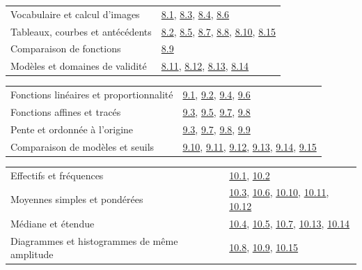 \begin{tabularx}{\linewidth}{@{}Yl@{}}\toprule
Vocabulaire et calcul d’images & \hyperref[exo-8-1]{8.1}, \hyperref[exo-8-3]{8.3}, \hyperref[exo-8-4]{8.4}, \hyperref[exo-8-6]{8.6}\\[2mm]
Tableaux, courbes et antécédents & \hyperref[exo-8-2]{8.2}, \hyperref[exo-8-5]{8.5}, \hyperref[exo-8-7]{8.7}, \hyperref[exo-8-8]{8.8}, \hyperref[exo-8-10]{8.10}, \hyperref[exo-8-15]{8.15}\\[2mm]
Comparaison de fonctions & \hyperref[exo-8-9]{8.9}\\[2mm]
Modèles et domaines de validité & \hyperref[exo-8-11]{8.11}, \hyperref[exo-8-12]{8.12}, \hyperref[exo-8-13]{8.13}, \hyperref[exo-8-14]{8.14}\\[2mm]
\bottomrule\end{tabularx}\par\vspace{4mm}
\begin{tabularx}{\linewidth}{@{}Yl@{}}\toprule
Fonctions linéaires et proportionnalité & \hyperref[exo-9-1]{9.1}, \hyperref[exo-9-2]{9.2}, \hyperref[exo-9-4]{9.4}, \hyperref[exo-9-6]{9.6}\\[2mm]
Fonctions affines et tracés & \hyperref[exo-9-3]{9.3}, \hyperref[exo-9-5]{9.5}, \hyperref[exo-9-7]{9.7}, \hyperref[exo-9-8]{9.8}\\[2mm]
Pente et ordonnée à l’origine & \hyperref[exo-9-3]{9.3}, \hyperref[exo-9-7]{9.7}, \hyperref[exo-9-8]{9.8}, \hyperref[exo-9-9]{9.9}\\[2mm]
Comparaison de modèles et seuils & \hyperref[exo-9-10]{9.10}, \hyperref[exo-9-11]{9.11}, \hyperref[exo-9-12]{9.12}, \hyperref[exo-9-13]{9.13}, \hyperref[exo-9-14]{9.14}, \hyperref[exo-9-15]{9.15}\\[2mm]
\bottomrule\end{tabularx}\par\vspace{4mm}
\clearpage
{}\fontsize{10}{13}\selectfont
{}\begin{tabularx}{\linewidth}{@{}Yl@{}}\toprule
Effectifs et fréquences & \hyperref[exo-10-1]{10.1}, \hyperref[exo-10-2]{10.2}\\[2mm]
Moyennes simples et pondérées & \hyperref[exo-10-3]{10.3}, \hyperref[exo-10-6]{10.6}, \hyperref[exo-10-10]{10.10}, \hyperref[exo-10-11]{10.11}, \hyperref[exo-10-12]{10.12}\\[2mm]
Médiane et étendue & \hyperref[exo-10-4]{10.4}, \hyperref[exo-10-5]{10.5}, \hyperref[exo-10-7]{10.7}, \hyperref[exo-10-13]{10.13}, \hyperref[exo-10-14]{10.14}\\[2mm]
Diagrammes et histogrammes de même amplitude & \hyperref[exo-10-8]{10.8}, \hyperref[exo-10-9]{10.9}, \hyperref[exo-10-15]{10.15}\\[2mm]
\bottomrule\end{tabularx}\par\vspace{4mm}
